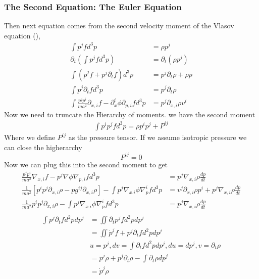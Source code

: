 \subsubsection{The Second Equation: The Euler Equation}
Then next equation comes from the second velocity moment of the Vlasov equation (),
\begin{equation}
	\begin{split}
		\int p^j f d^3p &= \rho p^j \\
		\partial_t(\int p^j f d^3p) &= \partial_t(\rho p^j) \\
		\int(\dot p^j f + p^j \partial_t f ) d^3p &= p^j\partial_t \rho + \rho \dot p \\
		\int p^j \partial_t f d^3p &= p^j \partial_t \rho \\
		\int \frac{p^j p^i}{ma^2} \partial_{x,i}f - \partial_x^i\phi\partial_{p,i}f d^3p &= p^j \partial_{x,i}\rho v^i
	\end{split}
\end{equation}
Now we need to truncate the Hierarchy of moments. we have the second moment
\begin{equation}
	\begin{split}
		\int p^ip^j f d^3p = \rho p^ip^j + P^{ij}
	\end{split}
\end{equation}
Where we define $P^{ij}$ as the pressure tensor. If we assume isotropic pressure we can close the higherarchy
\begin{equation}
	P^{ij} = 0
\end{equation}
Now we can plug this into the second moment to get
\begin{equation}
	\begin{split}
		\frac{p^jp^i}{ma^2}\nabla_{x,i}f - p^j\nabla \phi \nabla_{p,i}f d^3p &= p^j\nabla_{x,i}\rho \frac{dp}{dt} \\
		\frac{1}{ma^2} \left[ p^ip^j \partial_{x,i} \rho - pg^{ij}\partial_{x,i}\rho \right] - \int p^j \nabla_{x.i}\phi\nabla_p^i f d^3p &= v^j \partial_{x,i} \rho p^i + p^j\nabla_{x,i}\rho \frac{dp}{dt} \\
		\frac{1}{ma^2} p^ip^j \partial_{x,i} \rho - \int p^j \nabla_{x.i}\phi\nabla_p^i f d^3p &= p^j\nabla_{x,i}\rho \frac{dp}{dt} \\
	\end{split}
\end{equation}
\begin{equation}
	\begin{split}
		\int p^j \partial_t f d^2p dp^j &= \iint \partial_t p^j f d^2p dp^j \\
										&= \iint \dot p^j f + p^j\partial_t f d^2p dp^j \\
		                                & u=p^j, dv = \int \partial_t f d^2p dp^j,  du = dp^j, v = \partial_t \rho \\
		                                &= \dot p^j \rho + p^j\partial_t\rho - \int\partial_t\rho dp^j \\
		                                &= \dot p^j \rho
	\end{split}
\end{equation}
